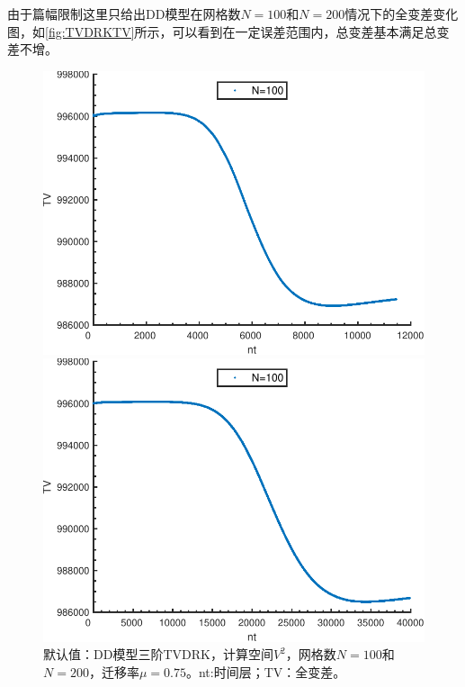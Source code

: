 由于篇幅限制这里只给出DD模型在网格数$N=100$和$N=200$情况下的全变差变化图，如\autoref{fig:TVDRKTV}所示，可以看到在一定误差范围内，总变差基本满足总变差不增。
\begin{figure}
    \centering
    \begin{minipage}{0.48\textwidth}
        \centering
        \includegraphics[width=\linewidth]{figure/TVDRKN100.pdf}
    \end{minipage}
    \begin{minipage}{0.48\textwidth}
        \centering
        \includegraphics[width=\linewidth]{figure/TVDRKN200.pdf}
    \end{minipage}
    \caption{默认值：DD模型三阶TVDRK，计算空间$V^2$，网格数$N=100$和$N=200$，迁移率$\mu=0.75$。nt:时间层；TV：全变差。}
    \label{fig:TVDRKTV}
\end{figure}